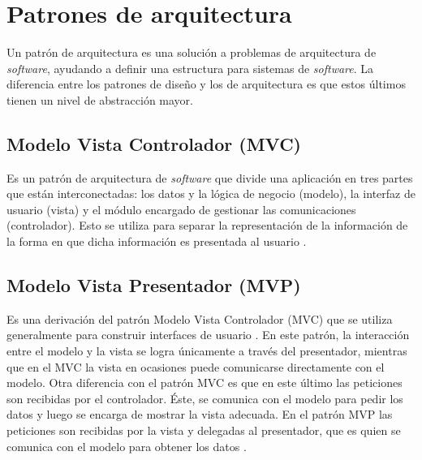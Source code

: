 \section{Patrones de arquitectura} \label{sect:Patrones de arquitectura}
Un patrón de arquitectura es una solución a problemas de arquitectura de \textit{software}, ayudando a definir una estructura para sistemas de \textit{software}. La diferencia entre los patrones de diseño y los de arquitectura es que estos últimos tienen un nivel de abstracción mayor. \cite{ACS0}

\subsection{Modelo Vista Controlador (MVC)}

Es un patrón de arquitectura de \textit{software} que divide una aplicación  en tres partes que están interconectadas: los datos y la lógica de negocio (modelo), la interfaz de usuario (vista) y el módulo encargado de gestionar las comunicaciones (controlador). Esto se utiliza para separar la representación de la información de la forma en que dicha información es presentada al usuario \cite{MVC0}.

\subsection{Modelo Vista Presentador (MVP)}

Es una derivación del patrón Modelo Vista Controlador (MVC) que se utiliza generalmente para construir interfaces de usuario \cite{MVP0}. En este patrón, la interacción entre el modelo y la vista se logra únicamente a través del presentador, mientras que en el MVC la vista en ocasiones puede comunicarse directamente con el modelo. Otra diferencia con el patrón MVC es que en este último las peticiones son recibidas por el controlador. Éste, se comunica con el modelo para pedir los datos y luego se encarga de mostrar la vista adecuada. En el patrón MVP las peticiones son recibidas por la vista y delegadas al presentador, que es quien se comunica con el modelo para obtener los datos \cite{MVP1}.